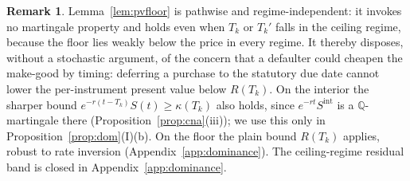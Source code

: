 \documentclass[11pt,letterpaper]{article}
\theoremstyle{plain}
\theoremstyle{definition}
\newtheorem{remark}[theorem]{Remark}
\newcommand{\Qmeasure}{\mathbb{Q}}           %
\numberwithin{equation}{section}
\begin{document}
\begin{remark}\label{rem:notiming}
Lemma~\ref{lem:pvfloor} is pathwise and regime-independent: it invokes no martingale property and holds even when $T_k$ or $T_k'$ falls in the ceiling regime, because the floor lies weakly below the price in every regime. It thereby disposes, without a stochastic argument, of the concern that a defaulter could cheapen the make-good by timing: deferring a purchase to the statutory due date cannot lower the per-instrument present value below $R(T_k)$. On the interior the sharper bound $e^{-r(t-T_k)}S(t)\ge\kappa(T_k)$ also holds, since $e^{-rt}S^{\mathrm{int}}$ is a $\Qmeasure$-martingale there (Proposition~\ref{prop:cna}(iii)); we use this only in Proposition~\ref{prop:dom}(I)(b). On the floor the plain bound $R(T_k)$ applies, robust to rate inversion (Appendix~\ref{app:dominance}). The ceiling-regime residual band is closed in Appendix~\ref{app:dominance}.
\end{remark}
\end{document}
